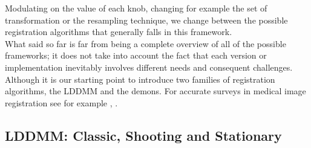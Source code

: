 \noindent
Modulating on the value of each knob, changing for example the set of transformation or the resampling technique, we change between the possible registration algorithms that generally falls in this framework.\\

\noindent
What said so far is far from being a complete overview of all of the possible frameworks; it does not take into account the fact that each version or implementation inevitably involves different needs and consequent challenges. Although it is our starting point to introduce two families of registration algorithms, the LDDMM and the demons.
For accurate surveys in medical image registration see for example \cite{Sotiras:survey:13}, \cite{zitova2003image} . \\

\subsection{LDDMM: Classic, Shooting and Stationary}\label{se:intro_lddmm}

